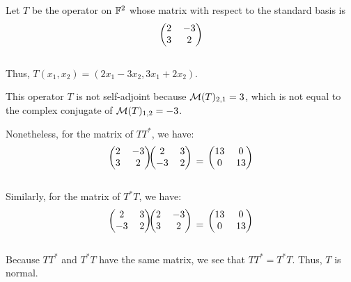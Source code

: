 \begin{example}
  Let $T$ be the operator on $\mathbb{F}^2$ whose matrix with respect to the standard basis is
  \[
    \begin{blockarray}{(cc)}
      2 & -3 \\
      3 & 2 \\
    \end{blockarray}
  \]

  Thus, $T(x_1, x_2) = (2x_1-3x_2, 3x_1 + 2x_2)$.

  This operator $T$ is not self-adjoint because $\mathcal{M}(T)_{2,1} = 3$, which is not equal to the complex conjugate of $\mathcal{M}(T)_{1,2} = -3$.

  Nonetheless, for the matrix of $TT^*$, we have:
  \[
  \begin{blockarray}{(cc)}
    2 & -3 \\
    3 & 2 \\
  \end{blockarray}
  \begin{blockarray}{(cc)}
  2 & 3 \\
  -3 & 2 \\
  \end{blockarray}
  \;=\;
  \begin{blockarray}{(cc)}
  13 & 0 \\
  0 & 13 \\
  \end{blockarray}
  \]

  Similarly, for the matrix of $T^*T$, we have:
  \[
  \begin{blockarray}{(cc)}
  2 & 3 \\
  -3 & 2 \\
  \end{blockarray}
  \begin{blockarray}{(cc)}
    2 & -3 \\
    3 & 2 \\
  \end{blockarray}
  \;=\;
  \begin{blockarray}{(cc)}
    13 & 0 \\
    0 & 13 \\
  \end{blockarray}
  \]

  Because $TT^*$ and $T^*T$ have the same matrix, we see that $TT^* = T^*T$. Thus, $T$ is normal.
\end{example}


